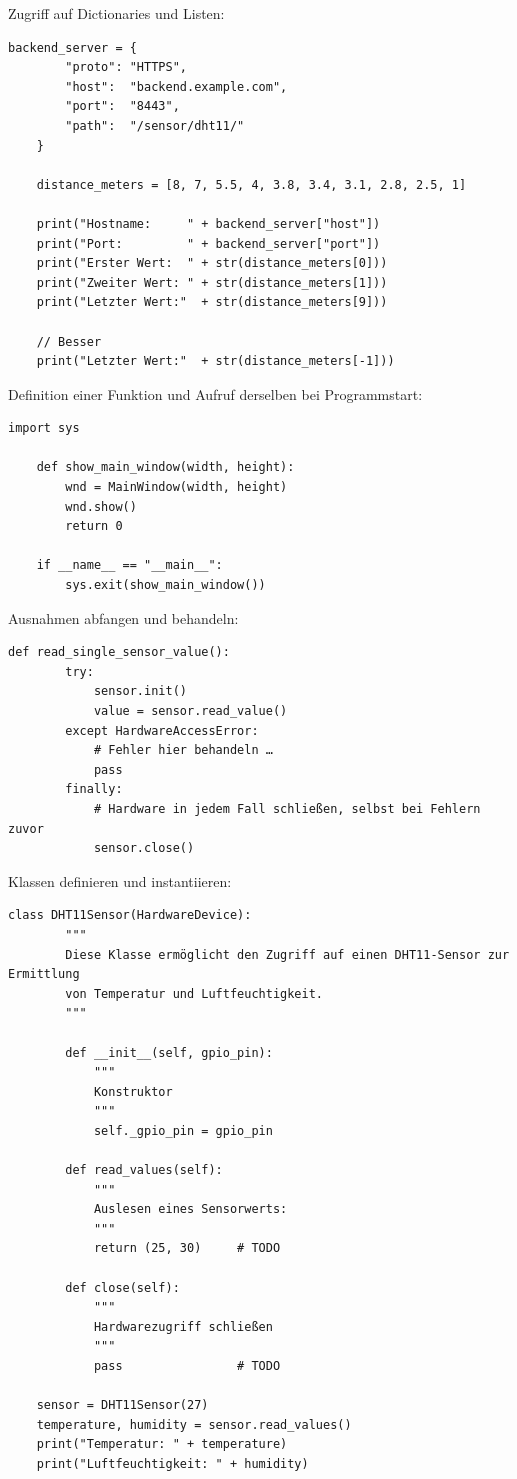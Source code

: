 \teilaufgabe
Zugriff auf Dictionaries und Listen:

\begin{Verbatim}[gobble=4]
    backend_server = {
        "proto": "HTTPS",
        "host":  "backend.example.com",
        "port":  "8443",
        "path":  "/sensor/dht11/"
    }

    distance_meters = [8, 7, 5.5, 4, 3.8, 3.4, 3.1, 2.8, 2.5, 1]

    print("Hostname:     " + backend_server["host"])
    print("Port:         " + backend_server["port"])
    print("Erster Wert:  " + str(distance_meters[0]))
    print("Zweiter Wert: " + str(distance_meters[1]))
    print("Letzter Wert:"  + str(distance_meters[9]))

    // Besser
    print("Letzter Wert:"  + str(distance_meters[-1]))
\end{Verbatim}

\bigskip
\teilaufgabe
Definition einer Funktion und Aufruf derselben bei Programmstart:

\begin{Verbatim}[gobble=4]
    import sys

    def show_main_window(width, height):
        wnd = MainWindow(width, height)
        wnd.show()
        return 0

    if __name__ == "__main__":
        sys.exit(show_main_window())
\end{Verbatim}

\teilaufgabe
Ausnahmen abfangen und behandeln:

\begin{Verbatim}[gobble=4]
    def read_single_sensor_value():
        try:
            sensor.init()
            value = sensor.read_value()
        except HardwareAccessError:
            # Fehler hier behandeln …
            pass
        finally:
            # Hardware in jedem Fall schließen, selbst bei Fehlern zuvor
            sensor.close()
\end{Verbatim}

\teilaufgabe
Klassen definieren und instantiieren:

\begin{Verbatim}[gobble=4]
    class DHT11Sensor(HardwareDevice):
        """
        Diese Klasse ermöglicht den Zugriff auf einen DHT11-Sensor zur Ermittlung
        von Temperatur und Luftfeuchtigkeit.
        """

        def __init__(self, gpio_pin):
            """
            Konstruktor
            """
            self._gpio_pin = gpio_pin

        def read_values(self):
            """
            Auslesen eines Sensorwerts:
            """
            return (25, 30)     # TODO

        def close(self):
            """
            Hardwarezugriff schließen
            """
            pass                # TODO

    sensor = DHT11Sensor(27)
    temperature, humidity = sensor.read_values()
    print("Temperatur: " + temperature)
    print("Luftfeuchtigkeit: " + humidity)
\end{Verbatim}

